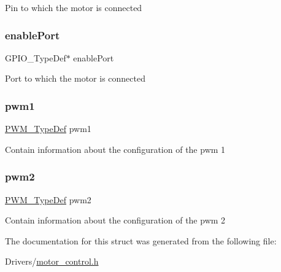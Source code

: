 Pin to which the motor is connected \mbox{\label{struct_motor___type_def_a0ed3538ba41cbf1643d12a76b8fcf6e1}} 
\subsubsection{\texorpdfstring{enable\+Port}{enablePort}}
{\footnotesize\ttfamily G\+P\+I\+O\+\_\+\+Type\+Def$\ast$ enable\+Port}

Port to which the motor is connected \mbox{\label{struct_motor___type_def_ab6053993e6628cef7e5e202a05e6a0ac}} 
\subsubsection{\texorpdfstring{pwm1}{pwm1}}
{\footnotesize\ttfamily \hyperlink{struct_p_w_m___type_def}{P\+W\+M\+\_\+\+Type\+Def} pwm1}

Contain information about the configuration of the pwm 1 \mbox{\label{struct_motor___type_def_afa92ea5c8db1b225b1c718099f986b8e}} 
\subsubsection{\texorpdfstring{pwm2}{pwm2}}
{\footnotesize\ttfamily \hyperlink{struct_p_w_m___type_def}{P\+W\+M\+\_\+\+Type\+Def} pwm2}

Contain information about the configuration of the pwm 2 

The documentation for this struct was generated from the following file\+:\begin{DoxyCompactItemize}
\item 
Drivers/\hyperlink{motor__control_8h}{motor\+\_\+control.\+h}\end{DoxyCompactItemize}
